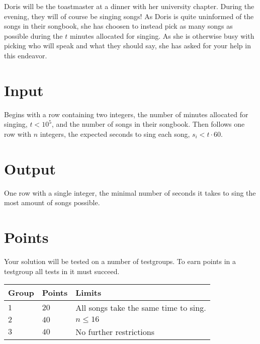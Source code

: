 \noindent
Doris will be the toastmaster at a dinner with her university chapter. During the evening, they will of course be singing songs! 
As Doris is quite uninformed of the songs in their songbook, she has choosen to instead pick as many songs as possible during the $t$ minutes allocated for singing. 
As she is otherwise busy with picking who will speak and what they should say, she has asked for your help in this endeavor.

\section*{Input}
\noindent
Begins with a row containing two integers, the number of minutes allocated for singing, $t < 10^5$, and the number of songs in their songbook. Then follows one row with $n$ integers, the expected seconds to sing each song, $s_i < t  \cdot 60$.

\section*{Output}
\noindent
One row with a single integer, the minimal number of seconds it takes to sing the most amount of songs possible.
\section*{Points}
\noindent
Your solution will be tested on a number of testgroups.
To earn points in a testgroup all tests in it must succeed.

\noindent
\begin{tabular}{| l | l | l |}
\hline
  Group & Points & Limits \\ \hline
  $1$    & $20$       &  All songs take the same time to sing.\\ \hline 
  $2$    & $40$       &  $n \leq 16$ \\ \hline
  $3$    & $40$       &  No further restrictions \\ \hline
\end{tabular}
